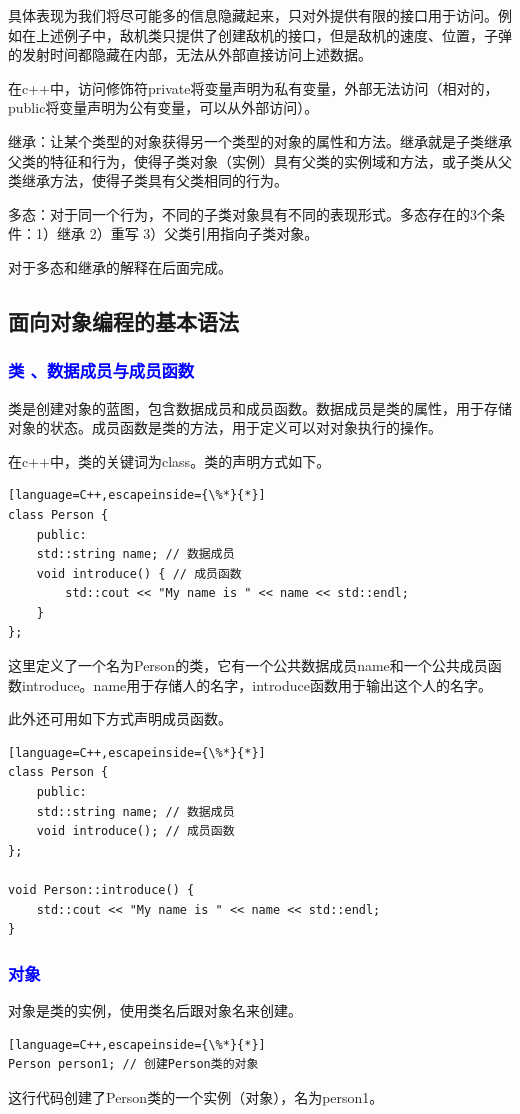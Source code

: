 \documentclass[UTF8]{ctexart}
\begin{document}
具体表现为我们将尽可能多的信息隐藏起来，只对外提供有限的接口用于访问。例如在上述例子中，敌机类只提供了创建敌机的接口，但是敌机的速度、位置，子弹的发射时间都隐藏在内部，无法从外部直接访问上述数据。

在c++中，访问修饰符private将变量声明为私有变量，外部无法访问（相对的，public将变量声明为公有变量，可以从外部访问）。

继承：让某个类型的对象获得另一个类型的对象的属性和方法。继承就是子类继承父类的特征和行为，使得子类对象（实例）具有父类的实例域和方法，或子类从父类继承方法，使得子类具有父类相同的行为。

多态：对于同一个行为，不同的子类对象具有不同的表现形式。多态存在的3个条件：1）继承 2）重写 3）父类引用指向子类对象。

对于多态和继承的解释在后面完成。
\subsection{面向对象编程的基本语法}
\subsubsection{\textcolor{blue}{类 、数据成员与成员函数}}
类是创建对象的蓝图，包含数据成员和成员函数。数据成员是类的属性，用于存储对象的状态。成员函数是类的方法，用于定义可以对对象执行的操作。

在c++中，类的关键词为class。类的声明方式如下。
\begin{lstlisting}[language=C++,escapeinside={\%*}{*}]
class Person {
	public:
	std::string name; // 数据成员
	void introduce() { // 成员函数
		std::cout << "My name is " << name << std::endl;
	}
};
\end{lstlisting}
这里定义了一个名为Person的类，它有一个公共数据成员name和一个公共成员函数introduce。name用于存储人的名字，introduce函数用于输出这个人的名字。

此外还可用如下方式声明成员函数。
\begin{lstlisting}[language=C++,escapeinside={\%*}{*}]
class Person {
	public:
	std::string name; // 数据成员
	void introduce(); // 成员函数
};

void Person::introduce() {
	std::cout << "My name is " << name << std::endl;
}
\end{lstlisting}
\subsubsection{\textcolor{blue}{对象}}
对象是类的实例，使用类名后跟对象名来创建。
\begin{lstlisting}[language=C++,escapeinside={\%*}{*}]
Person person1; // 创建Person类的对象
\end{lstlisting}
这行代码创建了Person类的一个实例（对象），名为person1。
\end{document}
